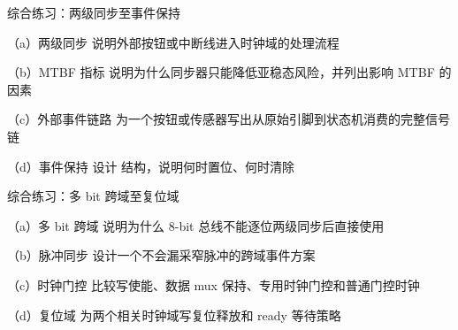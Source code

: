 \begin{chapterexercise}{综合练习：两级同步至事件保持}
\begin{exercisesubproblem}{（a）两级同步}
说明外部按钮或中断线进入时钟域的处理流程
\end{exercisesubproblem}
\begin{exercisesubproblem}{（b）MTBF 指标}
说明为什么同步器只能降低亚稳态风险，并列出影响 MTBF 的因素
\end{exercisesubproblem}
\begin{exercisesubproblem}{（c）外部事件链路}
为一个按钮或传感器写出从原始引脚到状态机消费的完整信号链
\end{exercisesubproblem}
\begin{exercisesubproblem}{（d）事件保持}
设计  结构，说明何时置位、何时清除
\end{exercisesubproblem}
\end{chapterexercise}

\begin{chapterexercise}{综合练习：多 bit 跨域至复位域}
\begin{exercisesubproblem}{（a）多 bit 跨域}
说明为什么 8-bit 总线不能逐位两级同步后直接使用
\end{exercisesubproblem}
\begin{exercisesubproblem}{（b）脉冲同步}
设计一个不会漏采窄脉冲的跨域事件方案
\end{exercisesubproblem}
\begin{exercisesubproblem}{（c）时钟门控}
比较写使能、数据 mux 保持、专用时钟门控和普通门控时钟
\end{exercisesubproblem}
\begin{exercisesubproblem}{（d）复位域}
为两个相关时钟域写复位释放和 ready 等待策略
\end{exercisesubproblem}
\end{chapterexercise}

